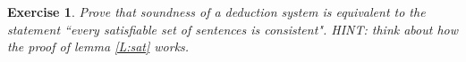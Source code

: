 \documentclass{article}
\theoremstyle{plain}
\newtheorem{Q}[theorem]{Exercise}{\bfseries}{\upshape}
\begin{document}
\begin{Q}\label{\prefix godel_equiv}
Prove that soundness of a deduction system is equivalent to the statement ``every satisfiable set of sentences is consistent". HINT: think about how the proof of lemma \ref{L:sat} works.
\end{Q}
\begin{comment}
\textbf{Solution:}
This argument is essentially the same as the proof of lemma \ref{L:sat} using lemma \ref{L:equiv}. First, soundness is the statement
\[\tag{$\dagger$} \Gamma\vdash \phi \implies \Gamma\models \phi,\]
and ``every satisfiable set of sentences is consistent" is $\Gamma\not\models \bot \implies \Gamma\not\vdash\bot$, which is equivalent to
\[\tag{$\ddagger$} \Gamma\vdash \bot \implies \Gamma\models \bot.\]

First we show that $(\dagger)\implies (\ddagger)$. To do this we must, assuming $(\dagger)$ and $\Gamma\vdash \bot$, prove that $\Gamma\models \bot$. First, choose $\psi\in\Gamma$. We must be able to do this as if $\Gamma$ is empty then we would not have $\Gamma\vdash \bot$. Let $\Gamma'=\Gamma\setminus\{\psi\}$. We proceed as follows:
\begin{align*}
\Gamma\vdash \bot &\iff \Gamma'\cup\{\psi\}\vdash\bot \\
&\iff \Gamma'\vdash \neg\psi \phantom{xxx}\text{ by lemma \ref{L:equiv}(2)} \\
&\implies \Gamma'\models \neg\psi \phantom{xxx}\text{ by ($\dagger$)}\\
&\iff \Gamma \models \bot \phantom{xxxx}\text{ by lemma \ref{L:equiv}(1)}.
\end{align*}
This is what we want, so $(\dagger)\implies (\ddagger)$. Now we must prove that $(\ddagger)\implies (\dagger)$. To do this we must show that, assuming $(\ddagger)$, if $\Gamma\vdash \phi$ then $\Gamma\models \phi$, for any sentence $\phi$. We proceed as follows:
\begin{align*}
\Gamma \vdash \phi &\iff \Gamma \vdash \neg\neg \phi \phantom{xxxxx}\text{ by classical logic}\\
&\iff\Gamma\cup\{\neg\phi\}\vdash \bot \phantom{x}\text{ by lemma \ref{L:equiv}(2)} \\
&\implies \Gamma\cup\{\neg\phi\}\models \bot \phantom{x}\text{ by $(\ddagger)$}\\
&\iff \Gamma \models \neg\neg \phi \phantom{xxixx}\text{ by lemma \ref{L:equiv}(1)}\\
&\iff \Gamma \models \phi \phantom{xxxxxxx}\text{ because this is true for truth tables}.
\end{align*}
\end{comment}
\end{document}
